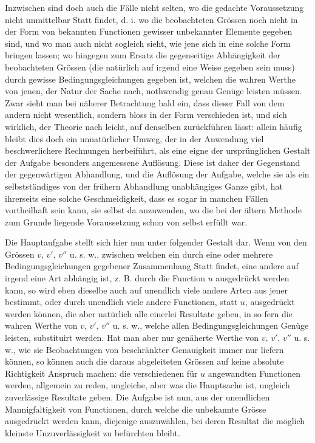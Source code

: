 Inzwischen sind doch auch die Fälle nicht selten, wo die gedachte Voraussetzung nicht unmittelbar Statt findet, d. i. wo die beobachteten Grössen noch nicht in der Form von bekannten Functionen gewisser unbekannter Elemente gegeben sind, und wo man auch nicht sogleich sieht, wie jene sich in eine solche Form bringen lassen; wo hingegen zum Ersatz die gegenseitige Abhängigkeit der beobachteten Grössen (die natürlich auf irgend eine Weise gegeben sein muss) durch gewisse Bedingungsgleichungen gegeben ist, welchen die wahren Werthe von jenen, der Natur der Sache nach, nothwendig genau Genüge leisten müssen. Zwar sieht man bei näherer Betrachtung bald ein, dass dieser Fall von dem andern nicht wesentlich, sondern bloss in der Form verschieden ist, und sich wirklich, der Theorie nach leicht, auf denselben zurückführen lässt: allein häufig bleibt dies doch ein unnatürlicher Umweg, der in der Anwendung viel beschwerlichere Rechnungen herbeiführt, als eine eigne der ursprünglichen Gestalt der Aufgabe besonders angemessene Auflösung. Diese ist daher der Gegenstand der gegenwärtigen Abhandlung, und die Auflösung der Aufgabe, welche sie als ein selbstständiges von der frühern Abhandlung unabhängiges Ganze gibt, hat ihrerseits eine solche Geschmeidigkeit, dass es sogar in manchen Fällen vortheilhaft sein kann, sie selbst da anzuwenden, wo die bei der ältern Methode zum Grunde liegende Voraussetzung schon von selbst erfüllt war.

Die Hauptaufgabe stellt sich hier nun unter folgender Gestalt dar. Wenn von den Grössen \(v,\,v',\,v''\) u. s. w., zwischen welchen ein durch eine oder mehrere Bedingungsgleichungen gegebener Zusammenhang Statt findet, eine andere auf irgend eine Art abhängig ist, z. B. durch die Function \(u\) ausgedrückt werden kann, so wird eben dieselbe auch auf unendlich viele andere Arten aus jener bestimmt, oder durch unendlich viele andere Functionen, statt \(u\), ausgedrückt werden können, die aber natürlich alle einerlei Resultate geben, in so fern die wahren Werthe von \(v,\,v',\,v''\) u. s. w., welche allen Bedingungsgleichungen Genüge leisten, substituirt werden. Hat man aber nur genäherte Werthe von \(v,\,v',\,v''\) u. s. w., wie sie Beobachtungen von beschränkter Genauigkeit immer nur liefern können, so
können auch die daraus abgeleiteten Grössen auf keine absolute Richtigkeit Anspruch machen: die verschiedenen für \(u\) angewandten Functionen werden, allgemein zu reden, ungleiche, aber was die Hauptsache ist, ungleich zuverlässige Resultate geben. Die Aufgabe ist nun, aus der unendlichen Mannigfaltigkeit von Functionen, durch welche die unbekannte Grösse ausgedrückt werden kann, diejenige auszuwählen, bei deren Resultat die möglich kleinste Unzuverlässigkeit zu befürchten bleibt.

